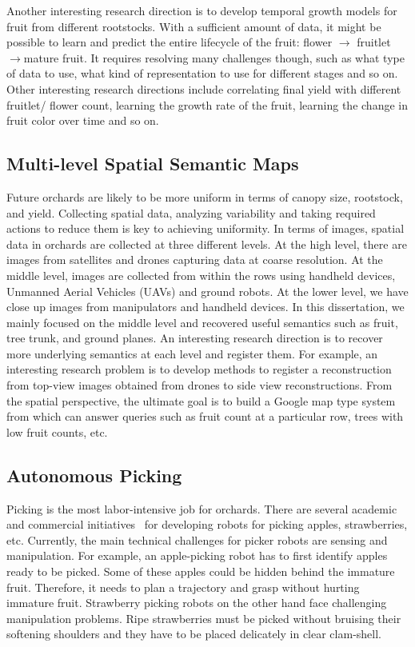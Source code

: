 Another interesting research direction is to develop temporal growth models for fruit from different rootstocks. With a sufficient amount of data, it might be possible to learn and predict the entire lifecycle of the fruit: flower $\to$ fruitlet $\to$mature fruit. It requires resolving many challenges though, such as what type of data to use, what kind of representation to use for different stages and so on. Other interesting research directions include correlating final yield with different fruitlet/ flower count, learning the growth rate of the fruit, learning the change in fruit color over time and so on.

\subsection{Multi-level Spatial Semantic Maps}
Future orchards are likely to be more uniform in terms of canopy size, rootstock, and yield. Collecting spatial data, analyzing variability and taking required actions to reduce them is key to achieving uniformity. In terms of images, spatial data in orchards are collected at three different levels. At the high level, there are images from satellites and drones capturing data at coarse resolution.  At the middle level, images are collected from within the rows using handheld devices, Unmanned Aerial Vehicles (UAVs) and ground robots. At the lower level, we have close up images from manipulators and handheld devices. In this dissertation, we mainly focused on the middle level and recovered useful semantics such as fruit, tree trunk, and ground planes. An interesting research direction is to recover more underlying semantics at each level and register them. For example, an interesting research problem is to develop methods to register a reconstruction from top-view images obtained from drones to side view reconstructions. From the spatial perspective, the ultimate goal is to build a Google map type system from which can answer queries such as fruit count at a particular row, trees with low fruit counts, etc.


\subsection{Autonomous Picking}
Picking is the most labor-intensive job for orchards. There are several academic and commercial initiatives~\cite{silwal2017design,xiong2018design,abundant} for developing robots for picking apples, strawberries, etc. Currently, the main technical challenges for picker robots are sensing and manipulation. For example, an apple-picking robot has to first identify apples ready to be picked. Some of these apples could be hidden behind the immature fruit. Therefore, it needs to plan a trajectory and grasp without hurting immature fruit. Strawberry picking robots on the other hand face challenging manipulation problems. Ripe strawberries must be picked without bruising their softening shoulders and they have to be placed delicately in clear clam-shell.

